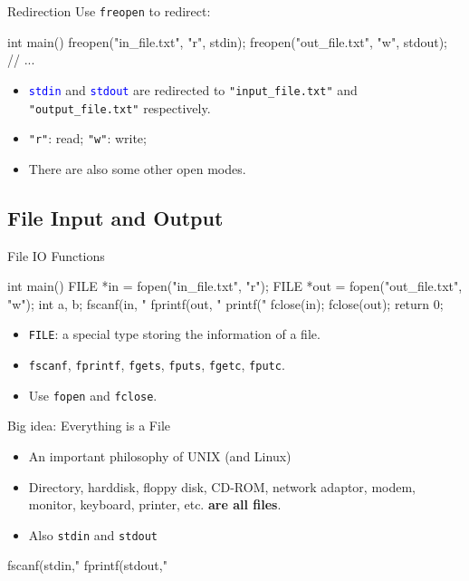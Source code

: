 \documentclass{beamer}
\newcommand{\blue}[1]{\textcolor{blue}{#1}}
\newcommand{\ttt}[1]{\texttt{#1}}
\newcommand{\bluett}[1]{\blue{\ttt{#1}}}
\theoremstyle{definition}
\begin{document}
\begin{frame}[fragile]{Redirection}
    Use \ttt{freopen} to redirect:
    \begin{cpp}
int main() {
  freopen("in_file.txt", "r", stdin);
  freopen("out_file.txt", "w", stdout);
  // ...
}
    \end{cpp}
    \pause
    \begin{itemize}
        \item \bluett{stdin} and \bluett{stdout} are redirected to \ttt{"input\_file.txt"} and \ttt{"output\_file.txt"} respectively.
        \item \ttt{"r"}: read; \ttt{"w"}: write;
        \item There are also some other open modes.
    \end{itemize}
\end{frame}

\subsection{File Input and Output}

\begin{frame}[fragile]{File IO Functions}
    \begin{cpp}
int main() {
  FILE *in = fopen("in_file.txt", "r");
  FILE *out = fopen("out_file.txt", "w");
  int a, b;
  fscanf(in, "%
  fprintf(out, "%
  printf("%
  fclose(in);
  fclose(out);
  return 0;
}
    \end{cpp}
    \begin{itemize}
        \item \ttt{FILE}: a special type storing the information of a file.
        \item \ttt{fscanf}, \ttt{fprintf}, \ttt{fgets}, \ttt{fputs}, \ttt{fgetc}, \ttt{fputc}.
        \item Use \ttt{fopen} and \ttt{fclose}.
    \end{itemize}
\end{frame}

\begin{frame}[fragile]{Big idea: Everything is a File}
    \begin{itemize}
        \item An important philosophy of UNIX (and Linux)
        \item Directory, harddisk, floppy disk, CD-ROM, network adaptor, modem, monitor, keyboard, printer, etc. \textbf{are all files}.
        \pause
        \item Also \ttt{stdin} and \ttt{stdout}
    \end{itemize}
    \pause
    \begin{cpp}
fscanf(stdin,"%
fprintf(stdout,"%
    \end{cpp}
\end{frame}
\end{document}
